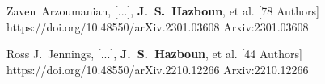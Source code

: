         {Zaven~{Arzoumanian}, [...], \textbf{J.~S.~{Hazboun}}, et al. [78 Authors]}
         {https://doi.org/10.48550/arXiv.2301.03608}
         {{Arxiv:}2301.03608}

         {Ross J.~{Jennings}, [...], \textbf{J.~S.~{Hazboun}}, et al. [44 Authors]}
         {https://doi.org/10.48550/arXiv.2210.12266}
         {{Arxiv:}2210.12266}


